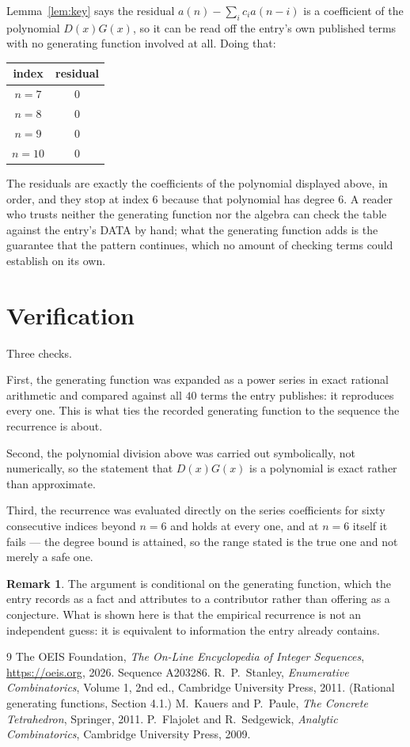 \documentclass[11pt,a4paper]{article}
\theoremstyle{plain}
\theoremstyle{definition}
\newtheorem{remark}[theorem]{Remark}
\begin{document}
Lemma~\ref{lem:key} says the residual $a(n)-\sum_ic_ia(n-i)$ is a coefficient of the
polynomial $D(x)G(x)$, so it can be read off the entry's own published terms with no
generating function involved at all. Doing that:
\begin{center}
\begin{tabular}{cc}
index & residual \\ \hline
$n=7$ & $0$ \\
$n=8$ & $0$ \\
$n=9$ & $0$ \\
$n=10$ & $0$
\end{tabular}
\end{center}
The residuals are exactly the coefficients of the polynomial displayed above, in order, and
they stop at index $6$ because that polynomial has degree $6$. A reader who trusts
neither the generating function nor the algebra can check the table against the entry's DATA
by hand; what the generating function adds is the guarantee that the pattern continues, which
no amount of checking terms could establish on its own.

\section{Verification}

Three checks.

First, the generating function was expanded as a power series in exact rational arithmetic and
compared against all $40$ terms the entry publishes: it reproduces every one. This is
what ties the recorded generating function to the sequence the recurrence is about.

Second, the polynomial division above was carried out symbolically, not numerically, so the
statement that $D(x)G(x)$ is a polynomial is exact rather than approximate.

Third, the recurrence was evaluated directly on the series coefficients for sixty consecutive
indices beyond $n=6$ and holds at every one, and at $n=6$ itself it fails --- the
degree bound is attained, so the range stated is the true one and not merely a safe one.

\begin{remark}
The argument is conditional on the generating function, which the entry records as a fact and
attributes to a contributor rather than offering as a conjecture. What is shown here is that
the empirical recurrence is not an independent guess: it is equivalent to information the
entry already contains.
\end{remark}

\begin{thebibliography}{9}
 The OEIS Foundation, \emph{The On-Line Encyclopedia of Integer
Sequences}, \url{https://oeis.org}, 2026. Sequence A203286.
 R.~P.~Stanley, \emph{Enumerative Combinatorics}, Volume 1, 2nd ed.,
Cambridge University Press, 2011. (Rational generating functions, Section 4.1.)
 M.~Kauers and P.~Paule, \emph{The Concrete Tetrahedron}, Springer, 2011.
 P.~Flajolet and R.~Sedgewick, \emph{Analytic Combinatorics}, Cambridge
University Press, 2009.
\end{thebibliography}
\end{document}
